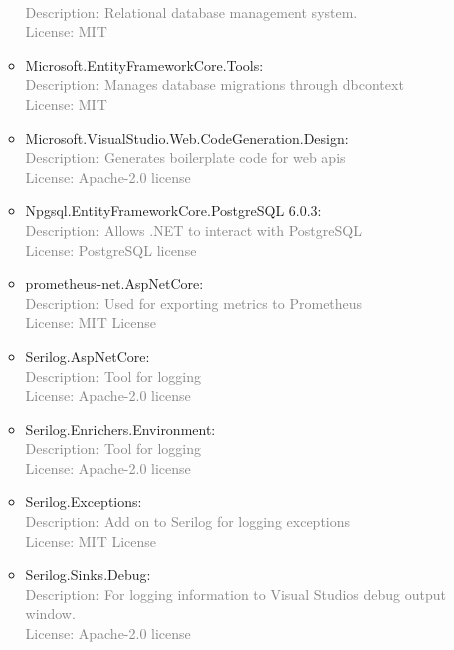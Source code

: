 \documentclass[10pt]{article}
\begin{document}
\begin{itemize}
\begin{itemize}
        \\\textcolor{gray}{Description: Relational database management system.}
        \\\textcolor{gray}{License: MIT}
        \item Microsoft.EntityFrameworkCore.Tools:
        \\\textcolor{gray}{Description: Manages database migrations through dbcontext}
        \\\textcolor{gray}{License: MIT}
        \item Microsoft.VisualStudio.Web.CodeGeneration.Design:
        \\\textcolor{gray}{Description: Generates boilerplate code for web apis}
        \\\textcolor{gray}{License: Apache-2.0 license}
        \item Npgsql.EntityFrameworkCore.PostgreSQL
6.0.3:
        \\\textcolor{gray}{Description: Allows .NET to interact with PostgreSQL}
        \\\textcolor{gray}{License: PostgreSQL license}
        
        \item prometheus-net.AspNetCore:
        \\\textcolor{gray}{Description: Used for exporting metrics to Prometheus}
        \\\textcolor{gray}{License: MIT License}
        
        \item Serilog.AspNetCore:
        \\\textcolor{gray}{Description: Tool for logging}
        \\\textcolor{gray}{License: Apache-2.0 license}
        
        \item Serilog.Enrichers.Environment:
        \\\textcolor{gray}{Description: Tool for logging}
        \\\textcolor{gray}{License: Apache-2.0 license}
        
        \item Serilog.Exceptions:
        \\\textcolor{gray}{Description: Add on to Serilog for logging exceptions}
        \\\textcolor{gray}{License: MIT License}
        
        \item Serilog.Sinks.Debug:
        \\\textcolor{gray}{Description: For logging information to Visual Studios debug output window.}
        \\\textcolor{gray}{License: Apache-2.0 license}
        

\end{itemize}
\end{itemize}
\end{document}
